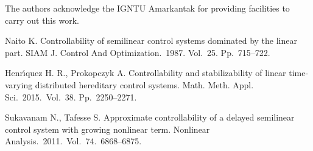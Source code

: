 \documentclass[12pt]{llncs}
\begin{document}
The authors acknowledge the IGNTU Amarkantak for providing facilities to carry out this work.

\begin{thebibliography}{9} %

  Naito K. Controllability of semilinear control systems dominated by the linear part. SIAM J. Control And Optimization.~1987. Vol.~25. Pp.~715--722.

 Henr\'{\i}quez H. R., Prokopczyk A. Controllability and stabilizability of linear time-varying distributed hereditary control systems. Math. Meth. Appl. Sci.~2015.~Vol.~38. Pp.~2250--2271.

 Sukavanam N., Tafesse S. Approximate controllability of a delayed semilinear control system with growing nonlinear term. Nonlinear Analysis.~2011.~Vol.~74.~6868--6875.

\end{thebibliography}

\end{document}
